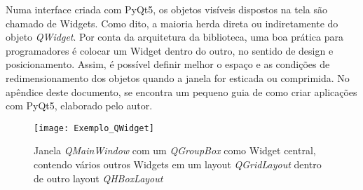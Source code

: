 Numa interface criada com PyQt5, os objetos visíveis dispostos na tela são chamado de Widgets. Como dito, a maioria herda direta ou indiretamente do objeto \emph{QWidget}. Por conta da arquitetura da biblioteca, uma boa prática para programadores é colocar um Widget dentro do outro, no sentido de design e posicionamento. Assim, é possível definir melhor o espaço e as condições de redimensionamento dos objetos quando a janela for esticada ou comprimida.
No apêndice deste documento, se encontra um pequeno guia de como criar aplicações com PyQt5, elaborado pelo autor.

\begin{figure}
\centering
\texttt{[image: Exemplo\_QWidget]}
\caption{Janela \emph{QMainWindow} com um \emph{QGroupBox} como Widget central, contendo vários outros Widgets em um layout \emph{QGridLayout} dentro de outro layout \emph{QHBoxLayout}}
\label{img_exemplo_qwidget}
\end{figure}

